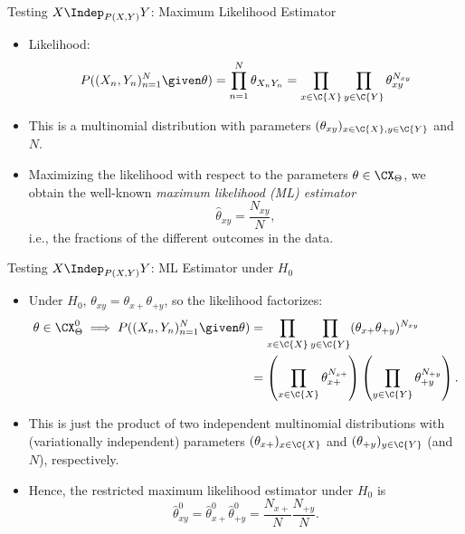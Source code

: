 \begin{frame}{Testing $X \Indep_{P(X,Y)} Y$: Maximum Likelihood Estimator}
  \begin{itemize}
    \item Likelihood:
$$P((X_n,Y_n)_{n=1}^N \given \theta) = \prod_{n=1}^N \theta_{X_nY_n} = \prod_{x\in\C{X}} \prod_{y\in\C{Y}} \theta_{xy}^{N_{xy}}$$
    \item This is a multinomial distribution with parameters $(\theta_{xy})_{x\in\C{X},y\in\C{Y}}$ and $N$.
    \item Maximizing the likelihood with respect to the parameters $\theta \in \CX_\Theta$, we obtain the well-known \emph{maximum likelihood (ML) estimator}
$$\hat \theta_{xy} = \frac{N_{xy}}{N},$$
i.e., the fractions of the different outcomes in the data.
  \end{itemize}
\end{frame}
 
\begin{frame}{Testing $X \Indep_{P(X,Y)} Y$: ML Estimator under $H_0$}
  \begin{itemize}
\item Under $H_0$, $\theta_{xy} = \theta_{x+}\theta_{+ y}$, so the likelihood factorizes:
\begin{equation*}\begin{split}
  \theta \in \CX_\Theta^0 \implies P((X_n,Y_n)_{n=1}^N \given \theta) 
  &= \prod_{x\in\C{X}} \prod_{y\in\C{Y}} (\theta_{x+} \theta_{+ y})^{N_{xy}} \\
  &= \left(\prod_{x\in\C{X}} \theta_{x+}^{N_{x+}} \right) \left(\prod_{y\in\C{Y}} \theta_{+ y}^{N_{+ y}}\right).
\end{split}\end{equation*}
\item This is just the product of two independent multinomial distributions with (variationally independent) parameters
$(\theta_{x+})_{x\in\C{X}}$ and $(\theta_{+ y})_{y\in\C{Y}}$ (and $N$), respectively.
\item Hence, the restricted maximum likelihood estimator under $H_0$ is 
$$\hat \theta^0_{xy} = \hat \theta^0_{x+} \hat \theta^0_{+ y} = \frac{N_{x+}}{N} \frac{N_{+ y}}{N}.$$
  \end{itemize}
\end{frame}

